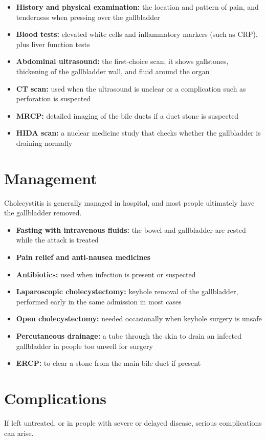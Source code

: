 \begin{itemize}
    \item \textbf{History and physical examination:} the location and pattern of pain, and tenderness when pressing over the gallbladder
    \item \textbf{Blood tests:} elevated white cells and inflammatory markers (such as CRP), plus liver function tests
    \item \textbf{Abdominal ultrasound:} the first-choice scan; it shows gallstones, thickening of the gallbladder wall, and fluid around the organ
    \item \textbf{CT scan:} used when the ultrasound is unclear or a complication such as perforation is suspected
    \item \textbf{MRCP:} detailed imaging of the bile ducts if a duct stone is suspected
    \item \textbf{HIDA scan:} a nuclear medicine study that checks whether the gallbladder is draining normally
\end{itemize}

\section*{Management}
Cholecystitis is generally managed in hospital, and most people ultimately have the gallbladder removed.

\begin{itemize}
    \item \textbf{Fasting with intravenous fluids:} the bowel and gallbladder are rested while the attack is treated
    \item \textbf{Pain relief and anti-nausea medicines}
    \item \textbf{Antibiotics:} used when infection is present or suspected
    \item \textbf{Laparoscopic cholecystectomy:} keyhole removal of the gallbladder, performed early in the same admission in most cases
    \item \textbf{Open cholecystectomy:} needed occasionally when keyhole surgery is unsafe
    \item \textbf{Percutaneous drainage:} a tube through the skin to drain an infected gallbladder in people too unwell for surgery
    \item \textbf{ERCP:} to clear a stone from the main bile duct if present
\end{itemize}

\section*{Complications}
If left untreated, or in people with severe or delayed disease, serious complications can arise.

